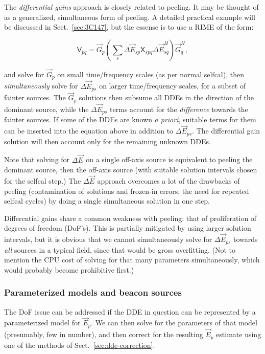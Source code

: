 \documentclass[]{aa}
\newcommand{\herm}{H}
\newcommand{\jones}[2]{\vec {#1}_{#2}}
\newcommand{\jonesT}[2]{\vec {#1}^{\herm}_{#2}}
\newcommand{\coh}[2]{\mathsf{{#1}}_{{#2}}}
\begin{document}
The \emph{differential gains} approach is closely related to peeling. It may be thought of as a generalized, simultaneous form of peeling. A detailed practical example will be discussed in Sect.~\ref{sec:3C147}, but the essense is to use a RIME of the form:

\[
\coh{V}{pq} = \jones{G}{p} \left( \sum_s \Delta\jones{E}{sp} \coh{X}{spq} \Delta\jonesT{E}{sq} \right)  \jonesT{G}{q},
\]

and solve for $\jones{G}{p}$ on small time/frequency scales (as per normal selfcal), then \emph{simultaneously} solve for $\Delta\jones{E}{ps}$ on larger time/frequency scales, for a subset of fainter sources. The $\jones{G}{p}$ solutions then subsume all DDEs in the direction of the dominant source, while the $\Delta\jones{E}{ps}$ terms account for the \emph{difference} towards the fainter sources. If some of the DDEs are known \emph{a priori}, suitable terms for them can be inserted into the equation above in addition to $\Delta\jones{E}{ps}$. The differential gain solution will then account only for the remaining unknown DDEs.

Note that solving for $\Delta\jones{E}{}$ on a single off-axis source is equivalent to peeling the dominant source, then the off-axis source (with suitable solution intervals chosen for the selfcal step.) The $\Delta\jones{E}{}$ approach overcomes a lot of the drawbacks of peeling (contamination of solutions and frozen-in errors, the need for repeated selfcal cycles) by doing a single simultaneous solution in one step.

Differential gains share a common weakness with peeling: that of proliferation of degrees of freedom (DoF's). This is partially mitigated by using larger solution intervals, but it is obvious that we cannot simultaneously solve for $\Delta\jones{E}{ps}$ towards \emph{all} sources in a typical field, since that would be gross overfitting. (Not to mention the CPU cost of solving for that many parameters simultaneously, which would probably become prohibitive first.) 

\subsubsection{Parameterized models and beacon sources}

The DoF issue can be addressed if the DDE in question can be represented by a parameterized model for $\jones{E}{p}$. We can then solve for the parameters of that model (presumably, few in number), and then correct for the resulting $\jones{E}{p}$ estimate using one of the methods of Sect.~\ref{sec:dde-correction}. 
\end{document}
